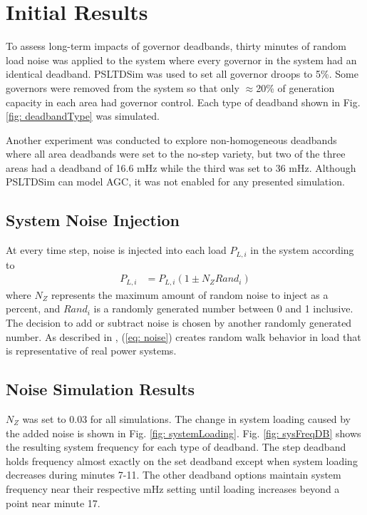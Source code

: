 \section{Initial Results}
To assess long-term impacts of governor deadbands, thirty minutes of random load noise was applied to the system where every governor in the system had an identical deadband.
PSLTDSim was used to set all governor droops to 5\%.
Some governors were removed from the system so that only $\approx$20\% of generation capacity in each area had governor control.
Each type of deadband shown in Fig. \ref{fig: deadbandType} was simulated.

Another experiment was conducted to explore non-homogeneous deadbands where all area deadbands were set to the no-step variety, but two of the three areas had a deadband of 16.6 mHz while the third was set to 36 mHz.
Although PSLTDSim can model AGC, it was not enabled for any presented simulation.



\subsection{System Noise Injection}
At every time step, noise is injected into each load $P_{L,i}$ in the system according to
\begin{align}
P_{L,i} &= P_{L,i}(1 \pm N_Z Rand_i) \label{eq: noise}
\end{align}
where $N_Z$ represents the maximum amount of random noise to inject as a percent,
and $Rand_i$ is a randomly generated number between 0 and 1 inclusive.
The decision to add or subtract noise is chosen by another randomly generated number.
As described in \cite{AGCCresap}, (\ref{eq: noise}) creates random walk behavior in load that is representative of real power systems.


\subsection{Noise Simulation Results}

$N_Z$ was set to 0.03 for all simulations. 
The change in system loading caused by the added noise is shown in Fig. \ref{fig: systemLoading}.
Fig. \ref{fig: sysFreqDB} shows the resulting system frequency for each type of deadband.
The step deadband holds frequency almost exactly on the set deadband except when system loading decreases during minutes 7-11.
The other deadband options maintain system frequency near their respective mHz setting until loading increases beyond a point near minute 17.


